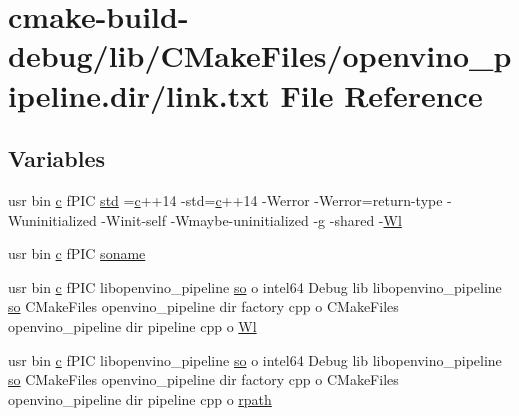 \hypertarget{lib_2CMakeFiles_2openvino__pipeline_8dir_2link_8txt}{}\section{cmake-\/build-\/debug/lib/\+C\+Make\+Files/openvino\+\_\+pipeline.dir/link.txt File Reference}
\label{lib_2CMakeFiles_2openvino__pipeline_8dir_2link_8txt}
\subsection*{Variables}
\begin{DoxyCompactItemize}
\item 
usr bin \hyperlink{CMakeCache_8txt_aac1d6a1710812201527c735f7c6afbaa}{c} f\+P\+IC \hyperlink{lib_2CMakeFiles_2openvino__pipeline_8dir_2link_8txt_a5f87c8f8e33670f7c8c5221b6be1bcc4}{std} =\hyperlink{CMakeCache_8txt_aac1d6a1710812201527c735f7c6afbaa}{c}++14 -\/std=\hyperlink{CMakeCache_8txt_aac1d6a1710812201527c735f7c6afbaa}{c}++14 -\/Werror -\/Werror=return-\/type -\/Wuninitialized -\/Winit-\/self -\/Wmaybe-\/uninitialized -\/g -\/shared -\/\hyperlink{thirdparty_2extension_2CMakeFiles_2cpu__extension_8dir_2link_8txt_af9ccbf658ed2deb89d0d79f211e5b033}{Wl}
\item 
usr bin \hyperlink{CMakeCache_8txt_aac1d6a1710812201527c735f7c6afbaa}{c} f\+P\+IC \hyperlink{lib_2CMakeFiles_2openvino__pipeline_8dir_2link_8txt_ab65a9b6457c4853ed17f89f945516e66}{soname}
\item 
usr bin \hyperlink{CMakeCache_8txt_aac1d6a1710812201527c735f7c6afbaa}{c} f\+P\+IC libopenvino\+\_\+pipeline \hyperlink{CMakeCache_8txt_aa98797039f48d335ee715de4cd92852f}{so} o intel64 Debug lib libopenvino\+\_\+pipeline \hyperlink{CMakeCache_8txt_aa98797039f48d335ee715de4cd92852f}{so} C\+Make\+Files openvino\+\_\+pipeline dir factory cpp o C\+Make\+Files openvino\+\_\+pipeline dir pipeline cpp o \hyperlink{lib_2CMakeFiles_2openvino__pipeline_8dir_2link_8txt_a4e8f0c7503e0544cac59a2ba0a889e25}{Wl}
\item 
usr bin \hyperlink{CMakeCache_8txt_aac1d6a1710812201527c735f7c6afbaa}{c} f\+P\+IC libopenvino\+\_\+pipeline \hyperlink{CMakeCache_8txt_aa98797039f48d335ee715de4cd92852f}{so} o intel64 Debug lib libopenvino\+\_\+pipeline \hyperlink{CMakeCache_8txt_aa98797039f48d335ee715de4cd92852f}{so} C\+Make\+Files openvino\+\_\+pipeline dir factory cpp o C\+Make\+Files openvino\+\_\+pipeline dir pipeline cpp o \hyperlink{lib_2CMakeFiles_2openvino__pipeline_8dir_2link_8txt_a3504e61d939c00da84a47a0afd2fc405}{rpath}
\end{DoxyCompactItemize}


